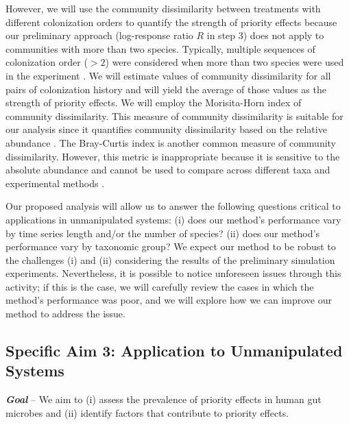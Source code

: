 \documentclass[12pt, class=article, crop=false]{standalone}
\begin{document}
However, we will use the community dissimilarity between treatments with different colonization orders to quantify the strength of priority effects because our preliminary approach (log-response ratio $R$ in step 3) does not apply to communities with more than two species.
Typically, multiple sequences of colonization order ($> 2$) were considered when more than two species were used in the experiment \citep{fukami_productivity-biodiversity_2003, fukami_assembly_2004, price_colonization_2004, jiang_community_2008, tucker_environmental_2014, pu_dispersal_2015, ojima_interactive_2017}.
We will estimate values of community dissimilarity for all pairs of colonization history and will yield the average of those values as the strength of priority effects. 
We will employ the Morisita-Horn index of community dissimilarity.
This measure of community dissimilarity is suitable for our analysis since it quantifies community dissimilarity based on the relative abundance \citep{magurran_biological_2011}.
The Bray-Curtis index is another common measure of community dissimilarity.
However, this metric is inappropriate because it is sensitive to the absolute abundance and cannot be used to compare across different taxa and experimental methods \citep{magurran_biological_2011}.

Our proposed analysis will allow us to answer the following questions critical to applications in unmanipulated systems: (i) does our method's performance vary by time series length and/or the number of species? (ii) does our method's performance vary by taxonomic group?
We expect our method to be robust to the challenges (i) and (ii) considering the results of the preliminary simulation experiments.
Nevertheless, it is possible to notice unforeseen issues through this activity; if this is the case, we will carefully review the cases in which the method's performance was poor, and we will explore how we can improve our method to address the issue.

\subsection*{Specific Aim 3: Application to Unmanipulated Systems}

\textbf{\textit{Goal}} -- 
We aim to (i) assess the prevalence of priority effects in human gut microbes and (ii) identify factors that contribute to priority effects.
\end{document}
